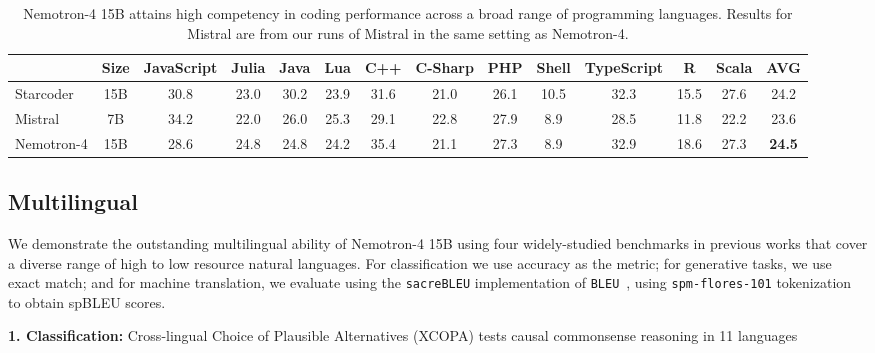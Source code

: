 \documentclass[11pt]{article}
\newcommand{\ours}{Nemotron-4}
\begin{document}
\begin{table}[t]
\centering
\begin{adjustbox}{max width=\textwidth, scale=1.0}
\begin{tabular}{lccccccccccccc}
\toprule
  & Size & JavaScript & Julia & Java & Lua & C++ & C-Sharp & PHP & Shell & TypeScript & R & Scala & AVG  \\
\midrule
Starcoder & 15B & 30.8 & 23.0 & 30.2 & 23.9 & 31.6 & 21.0 & 26.1	& 10.5 & 32.3 & 15.5 & 27.6 & 24.2 \\
Mistral & 7B & 34.2 & 22.0 & 26.0 & 25.3 & 29.1 & 22.8 & 27.9	& 8.9 & 28.5 & 11.8 & 22.2 & 23.6 \\
\ours{} & 15B & 28.6 & 24.8 & 24.8 & 24.2 & 35.4 & 21.1 & 27.3 & 8.9 & 32.9 & 18.6 & 27.3 & \textbf{24.5} \\ 
\bottomrule
\end{tabular}
\end{adjustbox}
\caption{\label{tab:multiple-e} \ours{} 15B attains high competency in coding performance across a broad range of programming languages. Results for Mistral are from our runs of Mistral in the same setting as \ours{}. }
\end{table}


\subsection{Multilingual}

We demonstrate the outstanding multilingual ability of \ours{} 15B using four widely-studied benchmarks in previous works that cover a diverse range of high to low resource natural languages. For classification we use accuracy as the metric; for generative tasks, we use exact match; and for machine translation, we evaluate using the \texttt{sacreBLEU} \citep{post2018} implementation of \texttt{BLEU}~\citep{papineni2002}, using \texttt{spm-flores-101} tokenization to obtain spBLEU scores. 


\textbf{1. Classification:}  Cross-lingual Choice of Plausible Alternatives (XCOPA) \citep{xcopa} tests causal commonsense reasoning in 11 languages 
\end{document}
